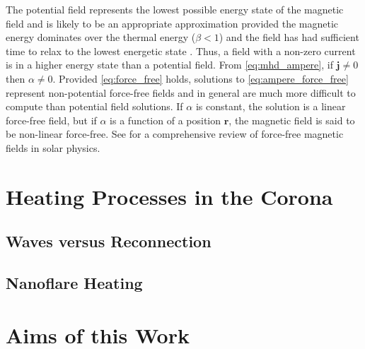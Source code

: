 The potential field represents the lowest possible energy state of the magnetic field and is likely to be an appropriate approximation provided the magnetic energy dominates over the thermal energy ($\beta<1$) and the field has had sufficient time to relax to the lowest energetic state \citep{priest_magnetohydrodynamics_2014}. Thus, a field with a non-zero current is in a higher energy state than a potential field. From \autoref{eq:mhd_ampere}, if $\mathbf{j}\neq0$ then $\alpha\neq0$. Provided \autoref{eq:force_free} holds, solutions to \autoref{eq:ampere_force_free} represent non-potential force-free fields and in general are much more difficult to compute than potential field solutions. If $\alpha$ is constant, the solution is a linear force-free field, but if $\alpha$ is a function of a position $\mathbf{r}$, the magnetic field is said to be non-linear force-free. See \citet{wiegelmann_solar_2012} for a comprehensive review of force-free magnetic fields in solar physics. 

\section{Heating Processes in the Corona}

\subsection{Waves versus Reconnection}

\subsection{Nanoflare Heating}

\section{Aims of this Work}

